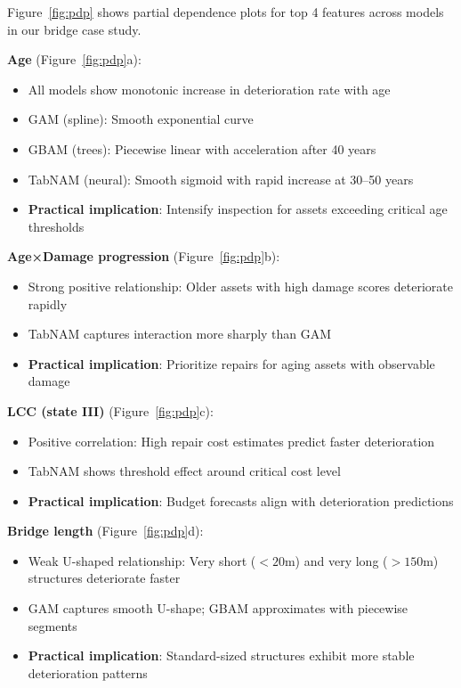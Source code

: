 \documentclass[twocolumn]{article}
\begin{document}
Figure~\ref{fig:pdp} shows partial dependence plots for top 4 features across models in our bridge case study.

\textbf{Age} (Figure~\ref{fig:pdp}a):
\begin{itemize}
\item All models show monotonic increase in deterioration rate with age
\item GAM (spline): Smooth exponential curve
\item GBAM (trees): Piecewise linear with acceleration after 40 years
\item TabNAM (neural): Smooth sigmoid with rapid increase at 30--50 years
\item \textbf{Practical implication}: Intensify inspection for assets exceeding critical age thresholds
\end{itemize}

\textbf{Age×Damage progression} (Figure~\ref{fig:pdp}b):
\begin{itemize}
\item Strong positive relationship: Older assets with high damage scores deteriorate rapidly
\item TabNAM captures interaction more sharply than GAM
\item \textbf{Practical implication}: Prioritize repairs for aging assets with observable damage
\end{itemize}

\textbf{LCC (state III)} (Figure~\ref{fig:pdp}c):
\begin{itemize}
\item Positive correlation: High repair cost estimates predict faster deterioration
\item TabNAM shows threshold effect around critical cost level
\item \textbf{Practical implication}: Budget forecasts align with deterioration predictions
\end{itemize}

\textbf{Bridge length} (Figure~\ref{fig:pdp}d):
\begin{itemize}
\item Weak U-shaped relationship: Very short ($<20$m) and very long ($>150$m) structures deteriorate faster
\item GAM captures smooth U-shape; GBAM approximates with piecewise segments
\item \textbf{Practical implication}: Standard-sized structures exhibit more stable deterioration patterns
\end{itemize}
\end{document}
